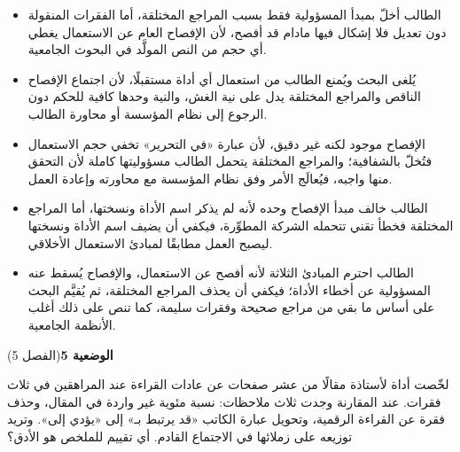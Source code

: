 \documentclass[11pt,a4paper]{article}
\begin{document}
\begin{itemize}[leftmargin=1.0cm, labelsep=6pt, itemsep=3pt, topsep=4pt, parsep=0pt]
  \item[\textbf{أ)}] الطالب أخلّ بمبدأ المسؤولية فقط بسبب المراجع المختلقة، أما الفقرات المنقولة دون تعديل فلا إشكال فيها مادام قد أفصح، لأن الإفصاح العام عن الاستعمال يغطي أي حجم من النص المولَّد في البحوث الجامعية.
  \item[\textbf{ب)}] يُلغى البحث ويُمنع الطالب من استعمال أي أداة مستقبلًا، لأن اجتماع الإفصاح الناقص والمراجع المختلقة يدل على نية الغش، والنية وحدها كافية للحكم دون الرجوع إلى نظام المؤسسة أو محاورة الطالب.
  \item[\textbf{ج)}] الإفصاح موجود لكنه غير دقيق، لأن عبارة «في التحرير» تخفي حجم الاستعمال فتُخلّ بالشفافية؛ والمراجع المختلقة يتحمل الطالب مسؤوليتها كاملة لأن التحقق منها واجبه، فيُعالَج الأمر وفق نظام المؤسسة مع محاورته وإعادة العمل.
  \item[\textbf{د)}] الطالب خالف مبدأ الإفصاح وحده لأنه لم يذكر اسم الأداة ونسختها، أما المراجع المختلقة فخطأ تقني تتحمله الشركة المطوِّرة، فيكفي أن يضيف اسم الأداة ونسختها ليصبح العمل مطابقًا لمبادئ الاستعمال الأخلاقي.
  \item[\textbf{هـ)}] الطالب احترم المبادئ الثلاثة لأنه أفصح عن الاستعمال، والإفصاح يُسقط عنه المسؤولية عن أخطاء الأداة؛ فيكفي أن يحذف المراجع المختلقة، ثم يُقيَّم البحث على أساس ما بقي من مراجع صحيحة وفقرات سليمة، كما تنص على ذلك أغلب الأنظمة الجامعية.
\end{itemize}
\par\vspace{6pt}
\noindent
{\large\khatt\textbf{الوضعية 5}}\hfill{\small(الفصل 5)}\par\nopagebreak\vspace{3pt}
\setlength{\fboxsep}{7pt}\colorbox{gray!10}{\parbox{\dimexpr\linewidth-14pt}{لخّصت أداة لأستاذة مقالًا من عشر صفحات عن عادات القراءة عند المراهقين في ثلاث فقرات. عند المقارنة وجدت ثلاث ملاحظات: نسبة مئوية غير واردة في المقال، وحذف فقرة عن القراءة الرقمية، وتحويل عبارة الكاتب «قد يرتبط بـ» إلى «يؤدي إلى». وتريد توزيعه على زملائها في الاجتماع القادم. أي تقييم للملخص هو الأدق؟}}\par\nopagebreak
\end{document}

